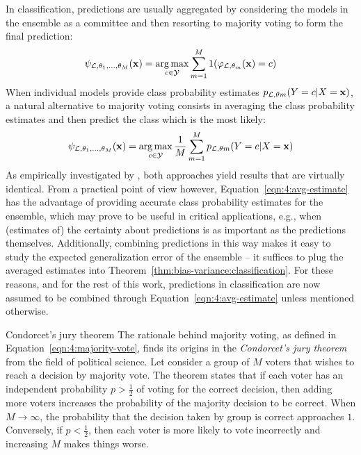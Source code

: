 In classification, predictions are usually aggregated by considering the
models in the ensemble as a committee  and then resorting to majority voting to
form the final prediction:
\begin{equation}\label{eqn:4:majority-vote}
\psi_{{\cal L},\theta_1,\dots,\theta_M}(\mathbf{x}) = \operatorname*{arg\,max}_{c \in {\cal Y}}  \sum_{m=1}^M 1(\varphi_{{\cal L},\theta_m}(\mathbf{x})=c)
\end{equation}
When individual models provide class probability estimates $p_{{\cal L},\theta m}(Y=c|X=\mathbf{x})$,
a natural alternative to majority voting consists in averaging the class probability estimates
and then predict the class which is the most likely:
\begin{equation}\label{eqn:4:avg-estimate}
\psi_{{\cal L},\theta_1,\dots,\theta_M}(\mathbf{x}) = \operatorname*{arg\,max}_{c \in {\cal Y}} \frac{1}{M} \sum_{m=1}^M p_{{\cal L},\theta m}(Y=c|X=\mathbf{x})
\end{equation}
As empirically investigated by \citet{breiman:1996b}, both approaches yield
results that are virtually identical. From a practical point of view however,
Equation~\ref{eqn:4:avg-estimate} has the advantage of providing accurate class
probability estimates for the ensemble, which may prove to be useful in
critical applications, e.g., when (estimates of) the certainty about
predictions is as important as the predictions themselves. Additionally,
combining predictions in this way makes it easy to study the expected
generalization error of the ensemble -- it suffices to plug the averaged
estimates into Theorem~\ref{thm:bias-variance:classification}. For these
reasons, and for the rest of this work, predictions in classification are now
assumed to be combined through Equation~\ref{eqn:4:avg-estimate} unless
mentioned otherwise.

\begin{remark}{Condorcet's jury theorem}
The rationale behind majority voting, as defined in Equation~\ref{eqn:4:majority-vote},
finds its origins in the \textit{Condorcet's jury theorem}
from the field of political science. Let consider a group of $M$ voters that
wishes to reach a decision by majority vote. The theorem states that if each
voter has an independent  probability $p > \tfrac{1}{2}$ of voting for the
correct decision, then adding more voters increases the probability of
the majority decision to be correct. When $M \to \infty$, the probability that the decision
taken by group is correct approaches $1$. Conversely, if $p < \tfrac{1}{2}$, then
each voter is more likely to vote incorrectly and increasing $M$ makes things
worse.
\end{remark}

